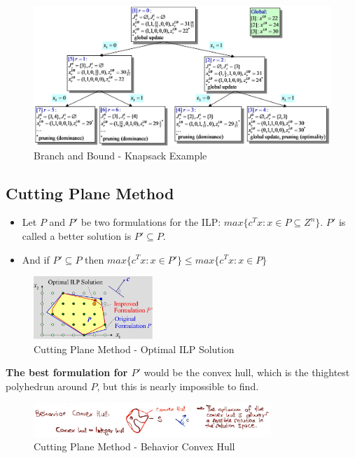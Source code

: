 \begin{figure}[H]
\centering
\includegraphics[width=1\textwidth]{figures/bbknapsack.png}
\caption{Branch and Bound - Knapsack Example}
\end{figure}

\clearpage

\subsection{Cutting Plane Method}

\begin{itemize}
    \item Let $P$ and $P'$ be two formulations for the ILP: $max\{c^Tx:x\in P \subseteq Z^n\}$. $P'$ is called a better solution is $P' \subseteq P$.
    \item And if $P' \subseteq P$ then $max\{c^Tx:x \in P'\} \leq max\{c^Tx:x \in P\}$
\end{itemize}


\begin{figure}[H]
\centering
\includegraphics[width=0.4\textwidth]{figures/optimalilpsolution.png}
\caption{Cutting Plane Method - Optimal ILP Solution}
\end{figure}

\textbf{The best formulation for $P'$} would be the convex hull, which is the thightest polyhedrun around $P$, but this is nearly impossible to find. 

\begin{figure}[H]
\centering
\includegraphics[width=0.8\textwidth]{figures/convexhull.png}
\caption{Cutting Plane Method - Behavior Convex Hull}
\end{figure}

